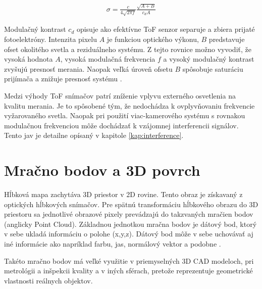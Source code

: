 \begin{equation}
\label{eq7}
\begin{aligned}
\sigma=\frac{c}{4\sqrt{2 \pi f}} \frac{\sqrt{A+B}}{c_d A}
\end{aligned}
\end{equation}

Modulačný kontrast $ c_d $ opisuje ako efektívne ToF senzor separuje a zbiera prijaté fotoelektróny. Intenzita pixelu $ A $ je funkciou optického výkonu, $ B $ predstavuje ofset okolitého svetla a reziduálneho systému. Z tejto rovnice možno vyvodiť, že vysoká hodnota $A$, vysoká modulačná frekvencia $f$ a vysoký modulačný kontrast zvyšujú presnosť merania. Naopak veľká úroveň ofsetu $B$ spôsobuje saturáciu prijímača a znižuje presnosť systému \cite{li2014time}. 

Medzi výhody ToF snímačov patrí zníženie vplyvu externého osvetlenia na kvalitu merania. Je to spôsobené tým, že nedochádza k ovplyvňovaniu frekvencie vyžarovaného svetla. Naopak pri použití viac-kamerového systému s rovnakou modulačnou frekvenciou môže dochádzať k vzájomnej interferencii signálov. Tento jav je detailne opísaný v kapitole \ref{kap:interference}.

\section{Mračno bodov a 3D povrch}

Hĺbková mapa zachytáva 3D priestor v 2D rovine. Tento obraz je získavaný z optických hĺbkových snímačov. Pre spätnú transformáciu hĺbkového obrazu do 3D priestoru sa jednotlivé obrazové pixely prevádzajú do takzvaných mračien bodov (anglicky Point Cloud). Základnou jednotkou mračna bodov je dátový bod, ktorý v sebe ukladá informáciu o polohe (x,y,z). Dátový bod môže v sebe uchovávať aj iné informácie ako napríklad farbu, jas, normálový vektor a podobne \cite{chua2017standards}. 

Takéto mračno bodov má veľké využitie v priemyselných 3D CAD modeloch, pri metrológii a inšpekcii kvality a v iných sférach, pretože reprezentuje geometrické vlastnosti reálnych objektov. 

